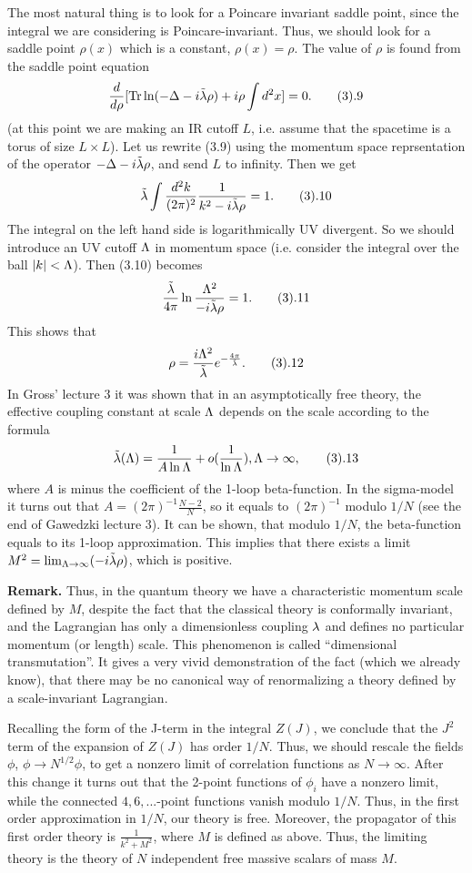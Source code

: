 The most natural thing is to look for a Poincare invariant saddle point, since
the integral we are considering is Poincare-invariant. Thus, we should look 
for a saddle point $\rho(x)$ which is a constant, $\rho(x)=\rho$. 
The value of $\rho$ is found from the saddle point equation
$$
\frac{d}{d\rho}
[\text{Tr}\ln(-\Delta-i\tl\rho)
+i\rho\int d^2x]=0.\tag 3.9
$$
(at this point we are making an IR cutoff $L$, i.e. assume that the spacetime 
is a torus of size $L\times L$). Let us rewrite (3.9) using the momentum space
reprsentation of the operator $-\Delta-i\tilde\lambda\rho$,  
and send $L$ to infinity. Then we get
$$
\tl\int \frac{d^2k}{(2\pi)^2}\frac{1}{k^2-i\tl\rho}
=1.\tag 3.10
$$ 
The integral on the left hand side is logarithmically UV divergent. 
So we should introduce an UV cutoff $\Lambda$ in momentum space
(i.e. consider the integral over the ball $|k|<\Lambda$). Then 
(3.10) becomes 
$$
\frac{\tl}{4\pi}\ln\frac{\L^2}{-i\tl\rho}=1.\tag 3.11
$$
This shows that
$$
\rho=\frac{i\L^2}{\tl}e^{-\frac{4\pi}{\tl}}.\tag 3.12
$$ 
In Gross' lecture 3 it was shown that in an asymptotically free theory, 
the effective coupling constant at scale $\Lambda$ depends on the scale 
according to the formula
$$
\tl(\L)=\frac{1}{A\ln \L}+o(\frac{1}{\ln \L}), \L\to\infty,\tag 3.13
$$
where $A$ is minus the coefficient of the 1-loop beta-function. 
In the sigma-model it turns out that $A=(2\pi)^{-1}\frac{N-2}{N}$,
so it equals to $(2\pi)^{-1}$ 
modulo $1/N$ (see the end of Gawedzki lecture 3). 
It can be shown, that modulo $1/N$, the beta-function equals 
to its 1-loop approximation. This implies that  
there exists a limit $M^2=\lim_{\Lambda\to\infty}(-i\tilde\lambda\rho)$, which is positive. 

{\bf Remark.} 
Thus, in the quantum theory we have a characteristic momentum scale
defined by $M$, despite the fact that the classical theory 
is conformally invariant, and the Lagrangian has only a dimensionless coupling
$\lambda$ and defines no particular momentum (or length) scale.
This phenomenon is called ``dimensional transmutation''.
It gives a very vivid demonstration of the fact (which we already know), that 
there may be no canonical way of renormalizing a 
theory defined by a scale-invariant Lagrangian. 

Recalling the form of the J-term in the integral $Z(J)$, we conclude 
that the $J^2$ term of the expansion of $Z(J)$ has order $1/N$.
Thus, we should rescale the fields $\phi$, $\phi\to N^{1/2}\phi$,  
to get a nonzero limit of correlation functions as 
$N\to\infty$. After this change it turns out that 
the 2-point functions of $\phi_i$ have a nonzero limit, 
while the connected $4,6,...$-point functions vanish modulo $1/N$.  
 Thus,  
in the first order approximation in $1/N$, our theory is free.
Moreover, the propagator of this first order theory 
is $\frac{1}{k^2+M^2}$, where $M$ is defined as above. 
Thus, the limiting theory is the theory of $N$ independent free 
massive scalars of mass $M$. 

